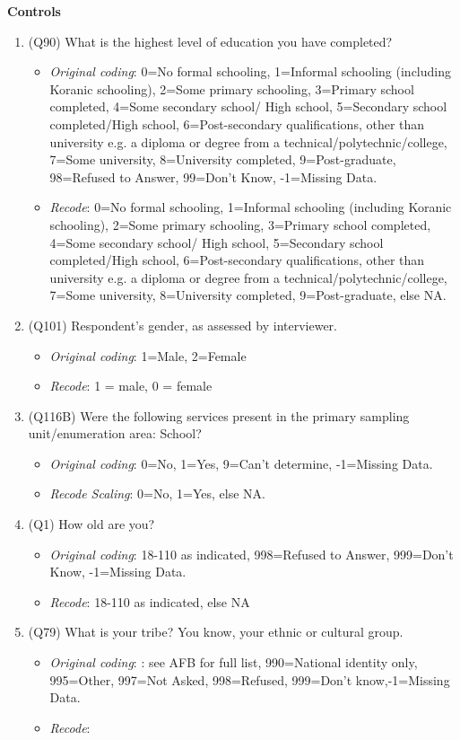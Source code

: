 \documentclass[]{article}
\begin{document}
\textbf{Controls}

\begin{enumerate}
  \item (Q90) What is the highest level of education you have completed?
  \begin{itemize}
  \item \textit{Original coding}: 0=No formal schooling, 1=Informal schooling (including Koranic schooling), 2=Some primary schooling, 3=Primary school completed, 4=Some secondary school/ High school, 5=Secondary school completed/High school, 6=Post-secondary qualifications, other than university e.g. a diploma or degree from a technical/polytechnic/college, 7=Some university, 8=University completed, 9=Post-graduate, 98=Refused to Answer, 99=Don’t Know, -1=Missing Data.
  \item \textit{Recode}: 0=No formal schooling, 1=Informal schooling (including Koranic schooling), 2=Some primary schooling, 3=Primary school completed, 4=Some secondary school/ High school, 5=Secondary school completed/High school, 6=Post-secondary qualifications, other than university e.g. a diploma or degree from a technical/polytechnic/college, 7=Some university, 8=University completed, 9=Post-graduate, else NA.
  \end{itemize}
  \item (Q101) Respondent's gender, as assessed by interviewer.
  \begin{itemize}
  \item \textit{Original coding}: 1=Male, 2=Female
  \item \textit{Recode}: 1 = male, 0 = female
  \end{itemize}
  \item (Q116B) Were the following services present in the primary sampling unit/enumeration area: School? 
  \begin{itemize}
  \item \textit{Original coding}: 0=No, 1=Yes, 9=Can’t determine, -1=Missing Data.\\ 
  \item \textit{Recode Scaling}: 0=No, 1=Yes, else NA.
  \end{itemize}
  \item (Q1) How old are you?
  \begin{itemize}
  \item \textit{Original coding}: 18-110 as indicated, 998=Refused to Answer, 999=Don’t Know, -1=Missing Data.
  \item \textit{Recode}: 18-110 as indicated, else NA
  \end{itemize}
  \item (Q79) What is your tribe? You know, your ethnic or cultural group. 
  \begin{itemize}
  \item \textit{Original coding}: : see AFB for full list, 990=National identity only, 995=Other, 997=Not Asked, 998=Refused, 999=Don’t know,-1=Missing Data.
  \item \textit{Recode}:
  \end{itemize}
\end{enumerate}
\end{document}
